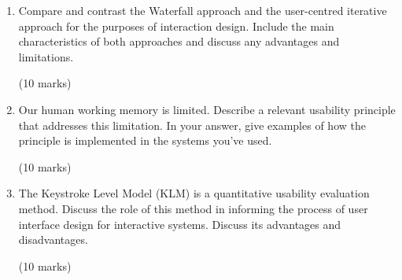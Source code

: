 \documentclass[11pt,a4paper]{report}
\begin{document}
\begin{enumerate}
\item Compare and contrast the Waterfall approach and the user-centred iterative approach for the purposes of interaction design. Include the main characteristics of both approaches and discuss any advantages and limitations.
    \begin{flushright}(10 marks)\end{flushright}

\item Our human working memory is limited. Describe a relevant usability principle that addresses this limitation. In your answer, give examples of how the principle is implemented in the systems you've used.
    \begin{flushright}(10 marks)\end{flushright}

\item The Keystroke Level Model (KLM) is a quantitative usability evaluation method. Discuss the role of this method in informing the process of user interface design for interactive systems. Discuss its advantages and disadvantages.
    \begin{flushright}(10 marks)\end{flushright}

\end{enumerate}
\end{document}
